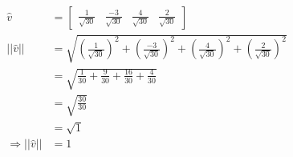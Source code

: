 \documentclass{article}
\begin{document}
\begin{equation}
    \begin{split}
        \hat{v} & = \begin{bmatrix}
            \frac{1}{\sqrt{30}} & \frac{-3}{\sqrt{30}} & \frac{4}{\sqrt{30}} & \frac{2}{\sqrt{30}}
        \end{bmatrix} \\
        ||\hat{v}|| & = \sqrt{(\frac{1}{\sqrt{30}})^2 + (\frac{-3}{\sqrt{30}})^2 + (\frac{4}{\sqrt{30}})^2 + (\frac{2}{\sqrt{30}})^2} \\
        & = \sqrt{\frac{1}{30} + \frac{9}{30} + \frac{16}{30} + \frac{4}{30}} \\
        & = \sqrt{\frac{30}{30}} \\
        & = \sqrt{1} \\
        \Longrightarrow ||\hat{v}|| & = 1
    \end{split}
\end{equation}
\end{document}
